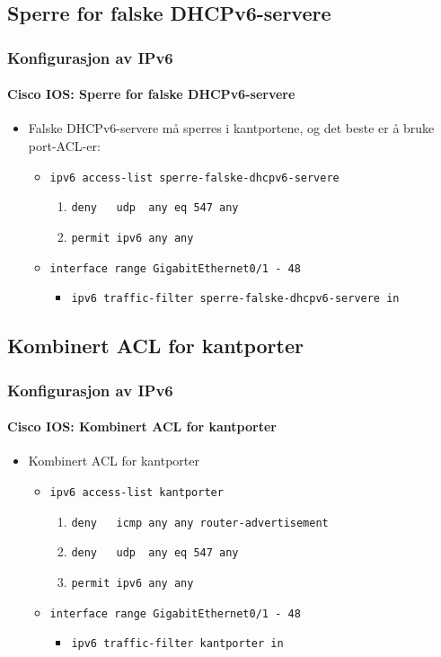 \subsection{Sperre for falske DHCPv6-servere}
\begin{frame}%
  \frametitle{Konfigurasjon av IPv6}
  \framesubtitle{Cisco IOS: Sperre for falske DHCPv6-servere}
  \pause
  \begin{itemize}[<+->]
  \item Falske DHCPv6-servere må sperres i kantportene, og det beste
    er å bruke port-ACL-er:
    \begin{itemize}[<+->]
    \item \texttt{ipv6 access-list sperre-falske-dhcpv6-servere}
      \begin{enumerate}[<+->]
      \item \texttt{deny\ \ \ udp\ \ any eq 547           any}
      \item \texttt{permit    ipv6   any \phantom{eq 547} any}
      \end{enumerate}
    \item \texttt{interface range GigabitEthernet0/1 - 48}
      \begin{itemize}[<+->]
      \item \texttt{ipv6 traffic-filter sperre-falske-dhcpv6-servere in}
      \end{itemize}
    \end{itemize}
  \end{itemize}
\end{frame}

\subsection{Kombinert ACL for kantporter}
\begin{frame}%
  \frametitle{Konfigurasjon av IPv6}
  \framesubtitle{Cisco IOS: Kombinert ACL for kantporter}
  \pause
  \begin{itemize}[<+->]
  \item Kombinert ACL for kantporter
    \begin{itemize}[<+->]
    \item \texttt{ipv6 access-list kantporter}
      \begin{enumerate}[<+->]
      \item \texttt{deny\ \ \ icmp   any \phantom{eq 547} any router-advertisement}
      \item \texttt{deny\ \ \ udp\ \ any eq 547           any}
      \item \texttt{permit    ipv6   any \phantom{eq 547} any}
      \end{enumerate}
    \item \texttt{interface range GigabitEthernet0/1 - 48}
      \begin{itemize}[<+->]
      \item \texttt{ipv6 traffic-filter kantporter in}
      \end{itemize}
    \end{itemize}
  \end{itemize}
\end{frame}


